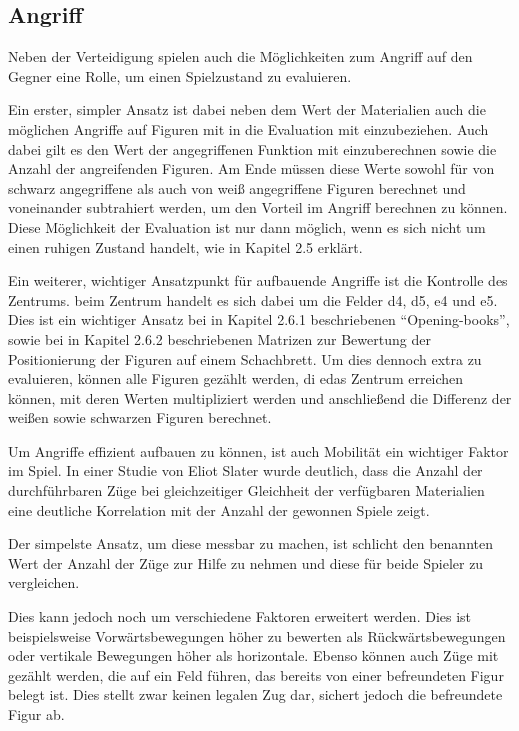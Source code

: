
\subsection{Angriff}

Neben der Verteidigung spielen auch die Möglichkeiten zum Angriff auf den Gegner eine Rolle, um einen Spielzustand zu evaluieren.

Ein erster, simpler Ansatz ist dabei neben dem Wert der Materialien auch die möglichen Angriffe auf Figuren mit in die Evaluation mit einzubeziehen. Auch dabei gilt es den Wert der angegriffenen Funktion mit einzuberechnen sowie die Anzahl der angreifenden Figuren. Am Ende müssen diese Werte sowohl für von schwarz angegriffene als auch von weiß angegriffene Figuren berechnet und voneinander subtrahiert werden, um den Vorteil im Angriff berechnen zu können. Diese Möglichkeit der Evaluation ist nur dann möglich, wenn es sich nicht um einen ruhigen Zustand handelt, wie in Kapitel 2.5 erklärt. 

Ein weiterer, wichtiger Ansatzpunkt für aufbauende Angriffe ist die Kontrolle des Zentrums. beim Zentrum handelt es sich dabei um die Felder d4, d5, e4 und e5. Dies ist ein wichtiger Ansatz bei in Kapitel 2.6.1 beschriebenen ``Opening-books'', sowie bei in Kapitel 2.6.2 beschriebenen Matrizen zur Bewertung der Positionierung der Figuren auf einem Schachbrett. Um dies dennoch extra zu evaluieren, können alle Figuren gezählt werden, di edas Zentrum erreichen können, mit deren Werten multipliziert werden und anschließend die Differenz der weißen sowie schwarzen Figuren berechnet. 


Um Angriffe effizient aufbauen zu können, ist auch Mobilität ein wichtiger Faktor im Spiel. In einer Studie von Eliot Slater wurde deutlich, dass die Anzahl der durchführbaren Züge bei gleichzeitiger Gleichheit der verfügbaren Materialien eine deutliche Korrelation mit der Anzahl der gewonnen Spiele zeigt.

Der simpelste Ansatz, um diese messbar zu machen, ist schlicht den benannten Wert der Anzahl der Züge zur Hilfe zu nehmen und diese für beide Spieler zu vergleichen.

Dies kann jedoch noch um verschiedene Faktoren erweitert werden. Dies ist beispielsweise Vorwärtsbewegungen höher zu bewerten als Rückwärtsbewegungen oder vertikale Bewegungen höher als horizontale. Ebenso können auch Züge mit gezählt werden, die auf ein Feld führen, das bereits von einer befreundeten Figur belegt ist. Dies stellt zwar keinen legalen Zug dar, sichert jedoch die befreundete Figur ab.

